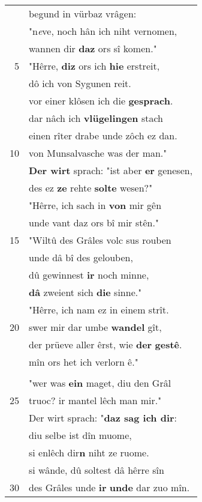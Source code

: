\documentclass[8pt,a4paper,notitlepage]{article}
\begin{document}
\begin{table}[ht]
\begin{minipage}[t]{0.5\linewidth}
\begin{tabular}{rl}
 & begund in vürbaz vrâgen:\\ 
 & "n\textit{e}ve, noch hân ich niht vernomen,\\ 
 & wannen dir \textbf{daz} ors sî komen."\\ 
5 & "Hêrre, \textbf{diz} ors ich \textbf{hie} erstreit,\\ 
 & dô ich von Sygunen reit.\\ 
 & vor einer klôsen ich die \textbf{gesprach}.\\ 
 & dar nâch ich \textbf{vlügelingen} stach\\ 
 & einen rîter drabe unde zôch ez dan.\\ 
10 & von Munsalvasche was der man."\\ 
 & \textbf{Der wirt} sprach: "ist aber \textbf{er} genesen,\\ 
 & des ez \textbf{ze} rehte \textbf{solte} wesen?"\\ 
 & "Hêrre, ich sach in \textbf{von} mir gên\\ 
 & unde vant daz ors bî mir stên."\\ 
15 & "Wiltû des Grâles volc sus rouben\\ 
 & unde dâ bî des gelouben,\\ 
 & dû gewinnest \textbf{ir} noch minne,\\ 
 & \textbf{dâ} zweient sich \textbf{die} sinne."\\ 
 & "Hêrre, ich nam ez in einem strît.\\ 
20 & swer mir dar umbe \textbf{wandel} gît,\\ 
 & der prüeve aller êrst, wie \textbf{der} \textbf{gestê}.\\ 
 & mîn ors het ich verlorn ê."\\ 
 & \textbf{\begin{large}E\end{large}ines tages vrâget in} Parcifal:\\ 
 & "wer was \textbf{ein} maget, diu den Grâl\\ 
25 & truoc? ir mantel lêch man mir."\\ 
 & Der wirt sprach: "\textbf{daz sag ich dir}:\\ 
 & diu selbe ist dîn muome,\\ 
 & si enlêch dir\textbf{n} niht ze ruome.\\ 
 & si wânde, dû soltest dâ hêrre sîn\\ 
30 & des Grâles unde \textbf{ir} \textbf{unde} dar zuo mîn.\\ 
\end{tabular}

\end{minipage}
\end{table}
\end{document}
